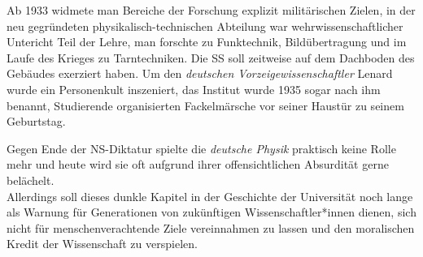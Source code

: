 Ab 1933 widmete man Bereiche der Forschung explizit militärischen Zielen, in der neu gegründeten physikalisch-technischen Abteilung war wehrwissenschaftlicher Untericht Teil der Lehre, man forschte zu Funktechnik, Bildübertragung und im Laufe des Krieges zu Tarntechniken. Die SS soll zeitweise auf dem Dachboden des Gebäudes exerziert haben.
Um den \textit{deutschen Vorzeigewissenschaftler} Lenard wurde ein Personenkult inszeniert, das Institut wurde 1935 sogar nach ihm benannt, Studierende organisierten Fackelmärsche vor seiner Haustür zu seinem Geburtstag. 

Gegen Ende der NS-Diktatur spielte die \textit{deutsche Physik} praktisch keine Rolle mehr und heute wird sie oft aufgrund ihrer offensichtlichen Absurdität gerne belächelt.\\ Allerdings soll dieses dunkle Kapitel in der Geschichte der Universität noch lange als Warnung für Generationen von zukünftigen Wissenschaftler*innen dienen, sich nicht für menschenverachtende Ziele vereinnahmen zu lassen und den moralischen Kredit der Wissenschaft zu verspielen.

